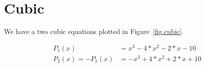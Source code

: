 \section{Cubic}
\label{sec.cubic}

We have a two cubic equations plotted in Figure~\ref{fig.cubic}.

\begin{align*}
  P_1(x) &= x^3 - 4*x^2 - 2*x - 10\\
  P_2(x) = -P_1(x) &= -x^3 + 4*x^2 + 2*x + 10
\end{align*}
